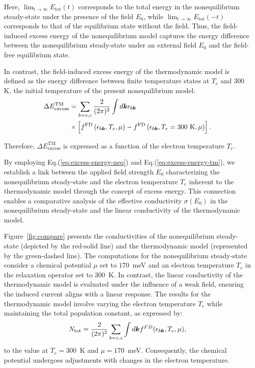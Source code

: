 Here, $\lim_{t\rightarrow \infty} E_{\mathrm{tot}}(t)$ corresponds to the total energy in the nonequilibrium steady-state under the presence of the field $E_0$, while $\lim_{t\rightarrow \infty} E_{\mathrm{tot}}(-t)$ corresponds to that of the equilibrium state without the field. Thus, the field-induced excess energy of the nonequilibrium model captures the energy difference between the nonequilibrium steady-state under an external field $E_0$ and the field-free equilibrium state.

In contrast, the field-induced excess energy of the thermodynamic model is defined as the energy difference between finite temperature states at $T_e$ and $300$K, the initial temperature of the present nonequilibrium model:
\begin{align}
\Delta E^\mathrm{TM}_{\mathrm{excess}}&=\sum_{b=v,c}\frac{2}{(2\pi)^2}\int d\boldsymbol k
\epsilon_{b\boldsymbol k} \nonumber \\
& \times \left [
f^{\mathrm{FD}}\left (\epsilon_{b\boldsymbol k},T_e,\mu \right )
-f^{\mathrm{FD}}\left (\epsilon_{b\boldsymbol k},T_e=300~\mathrm{K},\mu \right )
 \right ].
\label{eq:excess-energy-tm}
\end{align}

Therefore, $\Delta E^\mathrm{TM}_{\mathrm{excess}}$ is expressed as a function of the electron
temperature $T_e$.

By employing Eq.(\ref{eq:excess-energy-neq}) and Eq.(\ref{eq:excess-energy-tm}), we establish a link between the applied field strength $E_0$ characterizing the nonequilibrium steady-state and the electron temperature $T_e$ inherent to the thermodynamic model through the concept of excess energy. This connection enables a comparative analysis of the effective conductivity $\sigma(E_0)$ in the nonequilibrium steady-state and the linear conductivity of the thermodynamic model.

Figure~\ref{fig:compare} presents the conductivities of the nonequilibrium steady-state (depicted
by the red-solid line) and the thermodynamic model (represented by the green-dashed line). The
computations for the nonequilibrium steady-state consider a chemical potential $\mu$ set to
$170$~meV and an electron temperature $T_e$ in the relaxation operator set to $300$~K. In contrast,
the linear conductivity of the thermodynamic model is evaluated under the influence of a weak
field, ensuring the induced current aligns with a linear response. The results for the
thermodynamic model involve varying the electron temperature $T_e$ while maintaining the total
population constant, as expressed by:
\begin{align}
N_{\mathrm{tot}}=\frac{2}{(2\pi)^2}\sum_{b=v,c} \int d\boldsymbol k f^{FD}(\epsilon_{b\boldsymbol k},T_e,\mu),
\label{eq:tot-pop}
\end{align}
to the value at $T_e=300$~K and $\mu=170$~meV. Consequently, the chemical potential undergoes adjustments with changes in the electron temperature.

